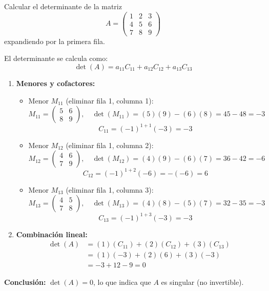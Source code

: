 \begin{example}
\label{ex:det-expansion}
Calcular el determinante de la matriz 
\[
A = \begin{pmatrix}
1 & 2 & 3 \\
4 & 5 & 6 \\
7 & 8 & 9
\end{pmatrix}
\]
expandiendo por la primera fila.
\begin{myproof}
El determinante se calcula como:
\[
\det(A) = a_{11}C_{11} + a_{12}C_{12} + a_{13}C_{13}
\]

\begin{enumerate}
\item \textbf{Menores y cofactores:}
\begin{itemize}
\item Menor $M_{11}$ (eliminar fila 1, columna 1):
\[
M_{11} = \begin{pmatrix}
5 & 6 \\
8 & 9
\end{pmatrix}, \quad 
\det(M_{11}) = (5)(9) - (6)(8) = 45 - 48 = -3
\]
\[
C_{11} = (-1)^{1+1}(-3) = -3
\]

\item Menor $M_{12}$ (eliminar fila 1, columna 2):
\[
M_{12} = \begin{pmatrix}
4 & 6 \\
7 & 9
\end{pmatrix}, \quad 
\det(M_{12}) = (4)(9) - (6)(7) = 36 - 42 = -6
\]
\[
C_{12} = (-1)^{1+2}(-6) = -(-6) = 6
\]

\item Menor $M_{13}$ (eliminar fila 1, columna 3):
\[
M_{13} = \begin{pmatrix}
4 & 5 \\
7 & 8
\end{pmatrix}, \quad 
\det(M_{13}) = (4)(8) - (5)(7) = 32 - 35 = -3
\]
\[
C_{13} = (-1)^{1+3}(-3) = -3
\]
\end{itemize}

\item \textbf{Combinación lineal:}
\begin{align*}
\det(A) &= (1)(C_{11}) + (2)(C_{12}) + (3)(C_{13}) \\
&= (1)(-3) + (2)(6) + (3)(-3) \\
&= -3 + 12 - 9 = 0
\end{align*}
\end{enumerate}

\textbf{Conclusión:} $\det(A) = 0$, lo que indica que $A$ es singular (no invertible).
\end{myproof}
\end{example}

